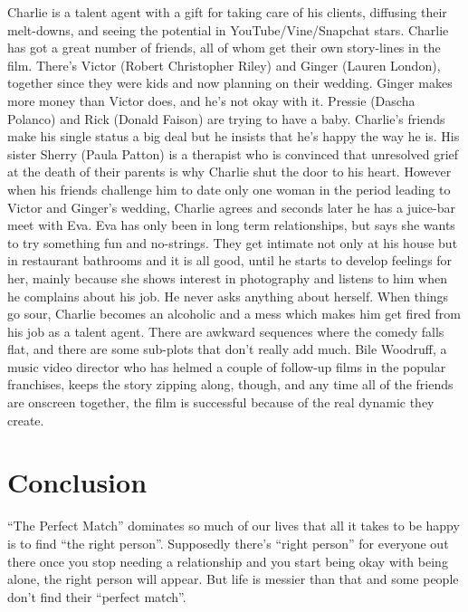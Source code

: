 \documentclass{article}
\begin{document}
Charlie is a talent agent with a gift for taking care of his clients, diffusing their melt-downs, and seeing the potential in YouTube/Vine/Snapchat stars. Charlie has got a great number of friends, all of whom get their own story-lines in the film. There’s Victor (Robert Christopher Riley) and Ginger (Lauren London), together since they were kids and now planning on their wedding. Ginger makes more money than Victor does, and he’s not okay with it. Pressie (Dascha Polanco) and Rick (Donald Faison) are trying to have a baby. Charlie’s friends make his single status a big deal but he insists that he’s happy the way he is. His sister Sherry (Paula Patton) is a therapist who is convinced that unresolved grief at the death of their parents is why Charlie shut the door to his heart. However when his friends challenge him to date only one woman in the period leading to Victor and Ginger’s wedding, Charlie agrees and seconds later he has a juice-bar meet with Eva.
Eva has only been in long term relationships, but says she wants to try something fun and no-strings. They get intimate not only at his house but in restaurant bathrooms and it is all good, until he starts to develop feelings for her, mainly because she shows interest in photography and listens to him when he complains about his job. He never asks anything about herself. When things go sour, Charlie becomes an alcoholic and a mess which makes him get fired from his job as a talent agent.
There are awkward sequences where the comedy falls flat, and there are some sub-plots that don’t really add much. Bile Woodruff, a music video director who has helmed a couple of follow-up films in the popular franchises, keeps the story zipping along, though, and any time all of the friends are onscreen together, the film is successful because of the real dynamic they create. 



\section{Conclusion}
 “The Perfect Match” dominates so much of our lives that all it takes to be happy is to find “the right person”. Supposedly there’s “right person” for everyone out there once you stop needing a relationship and you start being okay with being alone, the right person will appear. But life is messier than that and some people don’t find their “perfect match”.



	
\end{document}

